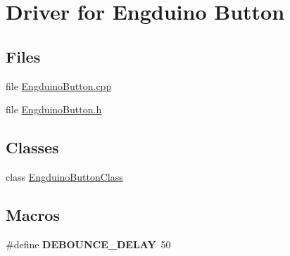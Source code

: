 \hypertarget{group___engduino_button}{}\section{Driver for Engduino Button}
\label{group___engduino_button}
\subsection*{Files}
\begin{DoxyCompactItemize}
\item 
file \hyperlink{_engduino_button_8cpp}{Engduino\+Button.\+cpp}
\item 
file \hyperlink{_engduino_button_8h}{Engduino\+Button.\+h}
\end{DoxyCompactItemize}
\subsection*{Classes}
\begin{DoxyCompactItemize}
\item 
class \hyperlink{class_engduino_button_class}{Engduino\+Button\+Class}
\end{DoxyCompactItemize}
\subsection*{Macros}
\begin{DoxyCompactItemize}
\item 
\hypertarget{group___engduino_button_gadb75862f582a7d68347ceae4f4c003c9}{}\#define {\bfseries D\+E\+B\+O\+U\+N\+C\+E\+\_\+\+D\+E\+L\+A\+Y}~50\label{group___engduino_button_gadb75862f582a7d68347ceae4f4c003c9}

\end{DoxyCompactItemize}
